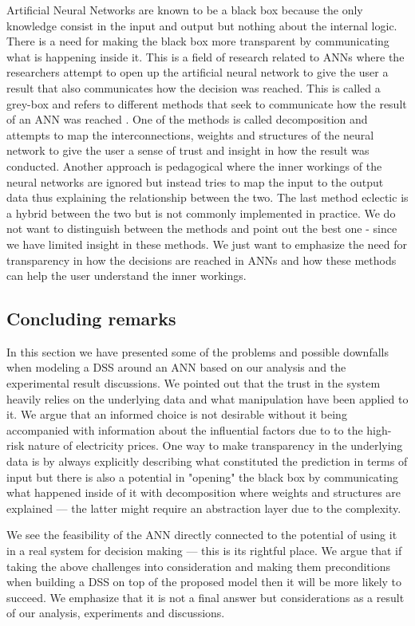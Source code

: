 Artificial Neural Networks are known to be a black box \cite{fromBlackBoxToTransparentBox} because the only knowledge consist in the input and output but nothing about the internal logic. There is a need for making the black box more transparent by communicating what is happening inside it. This is a field of research related to ANNs where the researchers attempt to open up the artificial neural network to give the user a result that also communicates how the decision was reached. This is called a grey-box and refers to different methods that seek to communicate how the result of an ANN was reached \cite{young2010using}. One of the methods is called decomposition and attempts to map the interconnections, weights and structures of the neural network to give the user a sense of trust and insight in how the result was conducted. Another approach is pedagogical where the inner workings of the neural networks are ignored but instead tries to map the input to the output data thus explaining the relationship between the two. The last method eclectic is a hybrid between the two but is not commonly implemented in practice. We do not want to distinguish between the methods and point out the best one - since we have limited insight in these methods. We just want to emphasize the need for transparency in how the decisions are reached in ANNs and how these methods can help the user understand the inner workings.

\subsection{Concluding remarks}
In this section we have presented some of the problems and possible downfalls when modeling a DSS around an ANN based on our analysis and the experimental result discussions. We pointed out that the trust in the system heavily relies on the underlying data and what manipulation have been applied to it. We argue that an informed choice is not desirable without it being accompanied with information about the influential factors due to to the high-risk nature of electricity prices. One way to make transparency in the underlying data is by always explicitly describing what constituted the prediction in terms of input but there is also a potential in "opening" the black box by communicating what happened inside of it with decomposition where weights and structures are explained --- the latter might require an abstraction layer due to the complexity. 

We see the feasibility of the ANN directly connected to the potential of using it in a real system for decision making --- this is its rightful place. We argue that if taking the above challenges into consideration and making them preconditions when building a DSS on top of the proposed model then it will be more likely to succeed. We emphasize that it is not a final answer but considerations as a result of our analysis, experiments and discussions.

